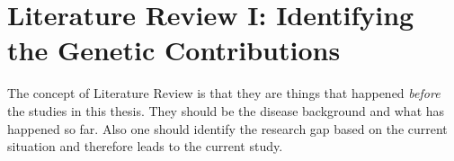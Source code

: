 \documentclass{book}
\begin{document}
	
	\chapter{Literature Review I: Identifying the Genetic Contributions}
	
	
	
	
	
	
	
	The concept of Literature Review is that they are things that happened \emph{before} the studies in this thesis.
	They should be the disease background and what has happened so far. 
	Also one should identify the research gap based on the current situation and therefore leads to the current study.
	
\end{document}
